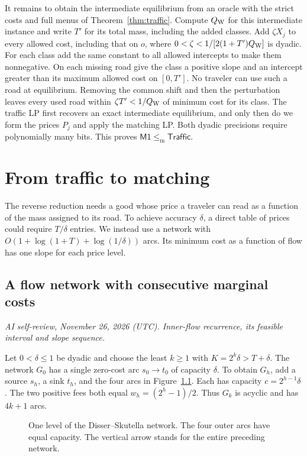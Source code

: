 \documentclass[11pt,oneside,openany,notitlepage]{report}
\newcommand{\Market}{\mathsf{M1}}
\newcommand{\Traffic}{\mathsf{Traffic}}
\newcommand{\dd}{\mathrel{\leq_{\mathrm m}}}
\newcommand{\reviewdate}{November 26, 2026 (UTC)}
\newcommand{\reviewmark}[1]{\par\nopagebreak[4]\noindent
  {\footnotesize\itshape AI self-review, \reviewdate. #1\par}\nobreak\smallskip}
\begin{document}
It remains to obtain the intermediate equilibrium from an oracle with the
strict costs and full menus of Theorem~\ref{thm:traffic}. Compute
\(Q_{\rm W}\) for this intermediate instance and write \(T'\) for its total
mass, including the added classes. Add \(\zeta X_j\) to every allowed cost,
including that on \(o\), where \(0<\zeta<1/[2(1+T')Q_{\rm W}]\) is dyadic.
For each class add the same constant to all allowed intercepts to make them
nonnegative. On each missing road give the class a positive slope and an
intercept greater than its maximum allowed cost on \([0,T']\). No traveler
can use such a road at equilibrium. Removing the common shift and then the
perturbation leaves every used road within \(\zeta T'<1/Q_{\rm W}\) of
minimum cost for its class. The traffic LP first recovers an exact
intermediate equilibrium, and only then do we form the prices \(P_j\) and
apply the matching LP. Both dyadic precisions require polynomially many
bits. This proves \(\Market\dd\Traffic\).

\chapter{From traffic to matching}\label{sec:device}

The reverse reduction needs a good whose price a traveler can read as a
function of the mass assigned to its road. To achieve accuracy \(\delta\),
a direct table of prices could require \(T/\delta\) entries. We instead
use a network with \(O(1+\log(1+T)+\log(1/\delta))\) arcs. Its minimum
cost as a function of flow has one slope for each price level.

\section{A flow network with consecutive marginal costs}
\reviewmark{Inner-flow recurrence, its feasible interval and slope sequence.}

Let \(0<\delta\le1\) be dyadic and choose the least \(k\ge1\) with
\(K=2^k\delta>T+\delta\). The network \(G_0\) has a single zero-cost arc
\(s_0\to t_0\) of capacity \(\delta\). To obtain \(G_h\), add a source
\(s_h\), a sink \(t_h\), and the four arcs in Figure~\ref{fig:count}.
Each has capacity \(c=2^{h-1}\delta\). The two positive fees both equal
\(w_h=(2^h-1)/2\). Thus \(G_k\) is acyclic and has \(4k+1\) arcs.

\begin{figure}[ht]
\centering
{}
\caption{One level of the Disser--Skutella network. The four outer arcs
have equal capacity. The vertical arrow stands for the entire preceding
network.}\label{fig:count}
\end{figure}
\end{document}
